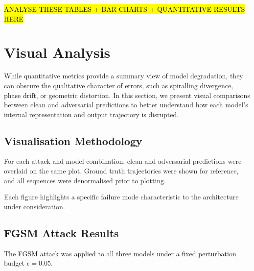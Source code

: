 \hl{ANALYSE THESE TABLES + BAR CHARTS + QUANTITATIVE RESULTS HERE}

\section{Visual Analysis}

While quantitative metrics provide a summary view of model degradation, they can obscure the qualitative character of errors, such as spiralling divergence, phase drift, or geometric distortion. In this section, we present visual comparisons between clean and adversarial predictions to better understand how each model's internal representation and output trajectory is disrupted.

\subsection*{Visualisation Methodology}

For each attack and model combination, clean and adversarial predictions were overlaid on the same plot.
Ground truth trajectories were shown for reference, and all sequences were denormalised prior to plotting.

Each figure highlights a specific failure mode characteristic to the architecture under consideration.

\subsection*{FGSM Attack Results}

The FGSM attack was applied to all three models under a fixed perturbation budget $\epsilon = 0.05$. 

